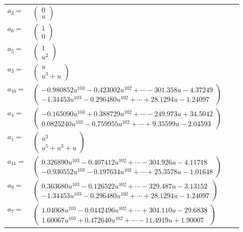 \documentclass[1p]{elsarticle_modified}
\theoremstyle{definition}
\begin{document}
\begin{tabular}{m{7pt} m{180pt} m{7pt} m{180pt} }
\flushright $a_{2}=$&$\begin{pmatrix}0\\u\end{pmatrix}$ \\
\flushright $a_{6}=$&$\begin{pmatrix}1\\0\end{pmatrix}$ \\
\flushright $a_{5}=$&$\begin{pmatrix}1\\u^2\end{pmatrix}$ \\
\flushright $a_{3}=$&$\begin{pmatrix}u\\u^3+u\end{pmatrix}$ \\
\flushright $a_{10}=$&$\begin{pmatrix}-0.980852 u^{103}-0.423002 u^{102}+\cdots-301.358 u-4.37249\\-1.34453 u^{103}-0.296480 u^{102}+\cdots+28.1294 u-1.24097\end{pmatrix}$ \\
\flushright $a_{4}=$&$\begin{pmatrix}-0.165090 u^{103}+0.388729 u^{102}+\cdots-249.973 u+34.5042\\0.0825240 u^{103}-0.759955 u^{102}+\cdots+9.35599 u-2.04593\end{pmatrix}$ \\
\flushright $a_{1}=$&$\begin{pmatrix}u^3\\u^5+u^3+u\end{pmatrix}$ \\
\flushright $a_{11}=$&$\begin{pmatrix}0.326890 u^{103}-0.407412 u^{102}+\cdots-304.926 u-4.11718\\-0.930552 u^{103}-0.197634 u^{102}+\cdots+25.3578 u-1.01648\end{pmatrix}$ \\
\flushright $a_{9}=$&$\begin{pmatrix}0.363680 u^{103}-0.126522 u^{102}+\cdots-329.487 u-3.13152\\-1.34453 u^{103}-0.296480 u^{102}+\cdots+28.1294 u-1.24097\end{pmatrix}$ \\
\flushright $a_{7}=$&$\begin{pmatrix}1.04068 u^{103}-0.0442496 u^{102}+\cdots+304.110 u-29.6838\\1.60067 u^{103}+0.472640 u^{102}+\cdots-11.4919 u+1.90007\end{pmatrix}$ \\

\end{tabular}
\end{document}
